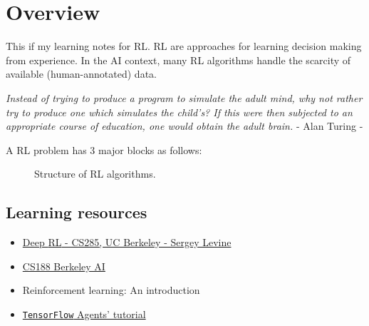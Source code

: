 \chapter{Overview}
This if my learning notes for \ac{RL}. \ac{RL} are approaches for learning decision making from experience. In the \ac{AI} context, many \ac{RL} algorithms handle the scarcity of available (human-annotated) data.

\begin{displayquote}
	\textit{Instead of trying to produce a program to simulate the adult mind, why not rather try to produce one which simulates the child's? If this were then subjected to an appropriate course of education, one would obtain the adult brain.} - Alan Turing -
\end{displayquote}

A \ac{RL} problem has 3 major blocks as follows:
\begin{figure}[hbt!]
	\centering
	\caption{Structure of \ac{RL} algorithms.}
	\label{fig:RL-structure}
\end{figure}

\section{Learning resources}
\begin{itemize}
	\item \href{http://rail.eecs.berkeley.edu/deeprlcourse/}{Deep \ac{RL} - CS285, UC Berkeley - Sergey Levine}
	\item \href{http://ai.berkeley.edu/lecture_videos.fhtml}{CS188 Berkeley AI}
	\item Reinforcement learning: An introduction \cite{sutton2018reinforcement}
	\item \href{https://www.tensorflow.org/agents/overview}{\texttt{TensorFlow} Agents' tutorial}
\end{itemize}

